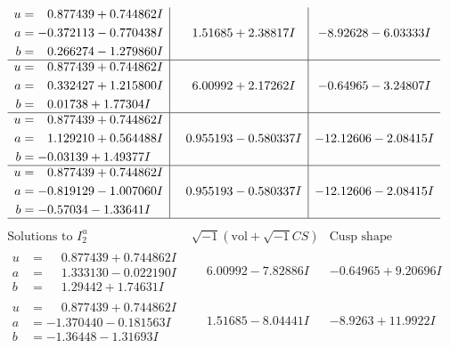 \documentclass[1p]{elsarticle_modified}
\theoremstyle{definition}
\newcommand{\I}{\sqrt{-1}}
\begin{document}
$$\begin{array}{c|c|c}
\begin{aligned}
u &= \phantom{-}0.877439 + 0.744862 I \\
a &= -0.372113 - 0.770438 I \\
b &= \phantom{-}0.266274 - 1.279860 I\end{aligned}
 & \phantom{-}1.51685 + 2.38817 I & -8.92628 - 6.03333 I \\ \hline\begin{aligned}
u &= \phantom{-}0.877439 + 0.744862 I \\
a &= \phantom{-}0.332427 + 1.215800 I \\
b &= \phantom{-}0.01738 + 1.77304 I\end{aligned}
 & \phantom{-}6.00992 + 2.17262 I & -0.64965 - 3.24807 I \\ \hline\begin{aligned}
u &= \phantom{-}0.877439 + 0.744862 I \\
a &= \phantom{-}1.129210 + 0.564488 I \\
b &= -0.03139 + 1.49377 I\end{aligned}
 & \phantom{-}0.955193 - 0.580337 I & -12.12606 - 2.08415 I \\ \hline\begin{aligned}
u &= \phantom{-}0.877439 + 0.744862 I \\
a &= -0.819129 - 1.007060 I \\
b &= -0.57034 - 1.33641 I\end{aligned}
 & \phantom{-}0.955193 - 0.580337 I & -12.12606 - 2.08415 I\\
 \hline 
 \end{array}$$\newpage$$\begin{array}{c|c|c}  
\text{Solutions to }I^u_{2}& \I (\text{vol} + \sqrt{-1}CS) & \text{Cusp shape}\\
 \hline 
\begin{aligned}
u &= \phantom{-}0.877439 + 0.744862 I \\
a &= \phantom{-}1.333130 - 0.022190 I \\
b &= \phantom{-}1.29442 + 1.74631 I\end{aligned}
 & \phantom{-}6.00992 - 7.82886 I & -0.64965 + 9.20696 I \\ \hline\begin{aligned}
u &= \phantom{-}0.877439 + 0.744862 I \\
a &= -1.370440 - 0.181563 I \\
b &= -1.36448 - 1.31693 I\end{aligned}
 & \phantom{-}1.51685 - 8.04441 I & -8.9263 + 11.9922 I \\ \hline\begin{aligned}

\end{aligned}
\end{array}$$
\end{document}
